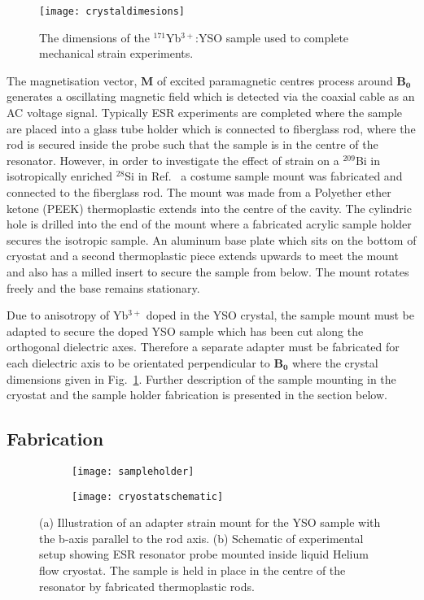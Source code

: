 \begin{figure}[h]
\centering
\texttt{[image: crystaldimesions]}
\caption{\label{fig:crystaldimesions} The dimensions of the $^{171}$Yb$^{3+}$:YSO sample used to complete mechanical strain experiments.}
\end{figure}

The magnetisation vector, $\bm{M}$ of excited paramagnetic centres process around $\bm{B_{0}}$ generates a oscillating magnetic field which is detected via the coaxial cable as an AC voltage signal. Typically ESR experiments are completed where the sample are placed into a glass tube holder which is connected to fiberglass rod, where the rod is secured inside the probe such that the sample is in the centre of the resonator. However, in order to investigate the effect of strain on a $^{209}$Bi in isotropically enriched $^{28}$Si in Ref.~\citep{PhysRevLett.120.167701} a costume sample mount was fabricated and connected to the fiberglass rod. The mount was made from a Polyether ether ketone (PEEK) thermoplastic extends into the centre of the cavity. The cylindric hole is drilled into the end of the mount where a fabricated acrylic sample holder secures the isotropic sample. An aluminum base plate which sits on the bottom of cryostat and a second thermoplastic piece extends upwards to meet the mount and also has a milled insert to secure the sample from below. The mount rotates freely and the base remains stationary. 

Due to anisotropy of Yb$^{3+}$ doped in the YSO crystal, the sample mount must be adapted to secure the doped YSO sample which has been cut along the orthogonal dielectric axes. Therefore a separate adapter must be fabricated for each dielectric axis to be orientated perpendicular to $\bm{B_{0}}$ where the crystal dimensions given in Fig.~\ref{fig:crystaldimesions}. Further description of the sample mounting in the cryostat and the sample holder fabrication is presented in the section below.   




\subsection{Fabrication}
\begin{figure}[H]
    \centering
    \begin{subfigure}[b]{0.35\textwidth}
        \centering
 \texttt{[image: sampleholder]}
       \caption{\label{fig:sampleholder}} 
       \end{subfigure}
    \begin{subfigure}[b]{0.4\textwidth}
        \centering
        \texttt{[image: cryostatschematic]}
        \caption{\label{fig:cryostatschematic} }
     \end{subfigure}
    \caption{(a) Illustration of an adapter strain mount for the YSO sample with the b-axis parallel to the rod axis. (b) Schematic of experimental setup showing ESR resonator probe mounted inside liquid Helium flow cryostat. The sample is held in place in the centre of the resonator by fabricated thermoplastic rods.}
\end{figure}

